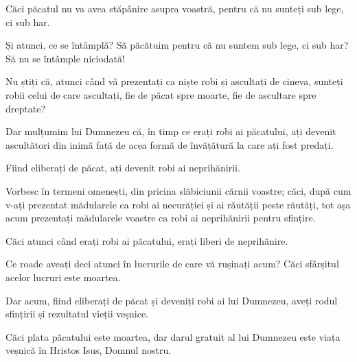 {Căci păcatul nu va avea stăpânire asupra voastră, pentru că nu sunteți sub lege, ci sub har.


\par }{\PP {}Și atunci, ce se întâmplă? Să păcătuim pentru că nu suntem sub lege, ci sub har? Să nu se întâmple niciodată!

Nu știți că, atunci când vă prezentați ca niște robi și ascultați de cineva, sunteți robii celui de care ascultați, fie de păcat spre moarte, fie de ascultare spre dreptate?

Dar mulțumim lui Dumnezeu că, în timp ce erați robi ai păcatului, ați devenit ascultători din inimă față de acea formă de învățătură la care ați fost predați.

Fiind eliberați de păcat, ați devenit robi ai neprihănirii.


\par }{\PP {}Vorbesc în termeni omenești, din pricina slăbiciunii cărnii voastre; căci, după cum v-ați prezentat mădularele ca robi ai necurăției și ai răutății peste răutăți, tot așa acum prezentați mădularele voastre ca robi ai neprihănirii pentru sfințire.

Căci atunci când erați robi ai păcatului, erați liberi de neprihănire.

Ce roade aveați deci atunci în lucrurile de care vă rușinați acum? Căci sfârșitul acelor lucruri este moartea.

Dar acum, fiind eliberați de păcat și deveniți robi ai lui Dumnezeu, aveți rodul sfințirii și rezultatul vieții veșnice.

Căci plata păcatului este moartea, dar darul gratuit al lui Dumnezeu este viața veșnică în Hristos Isus, Domnul nostru.



\par }
